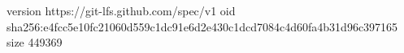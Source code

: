 version https://git-lfs.github.com/spec/v1
oid sha256:e4fcc5e10fc21060d559c1dc91e6d2e430c1dcd7084c4d60fa4b31d96c397165
size 449369
